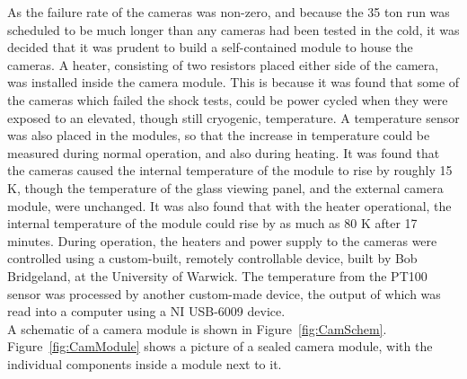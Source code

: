 As the failure rate of the cameras was non-zero, and because the 35 ton run was scheduled to be much longer than any cameras had been tested in the cold, it was decided that it was prudent to build a self-contained module to house the cameras. A heater, consisting of two resistors placed either side of the camera, was installed inside the camera module. This is because it was found that some of the cameras which failed the shock tests, could be power cycled when they were exposed to an elevated, though still cryogenic, temperature. A temperature sensor was also placed in the modules, so that the increase in temperature could be measured during normal operation, and also during heating. It was found that the cameras caused the internal temperature of the module to rise by roughly 15 K, though the temperature of the glass viewing panel, and the external camera module, were unchanged. It was also found that with the heater operational, the internal temperature of the module could rise by as much as 80 K after 17 minutes. During operation, the heaters and power supply to the cameras were controlled using a custom-built, remotely controllable device, built by Bob Bridgeland, at the University of Warwick. The temperature from the PT100 sensor was processed by another custom-made device, the output of which was read into a computer using a NI USB-6009 device. \\

A schematic of a camera module is shown in Figure~\ref{fig:CamSchem}. Figure~\ref{fig:CamModule} shows a picture of a sealed camera module, with the individual components inside a module next to it. \\

